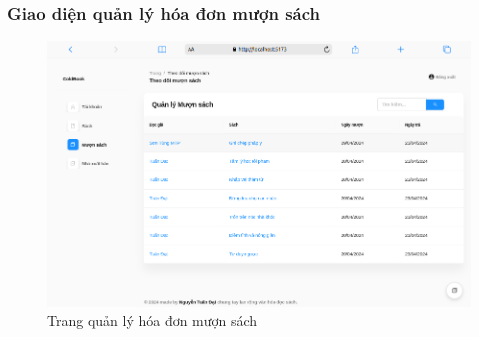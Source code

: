 \subsubsection{Giao diện quản lý hóa đơn mượn sách}
\begin{figure}[H]
  \centering
   \includegraphics[width=1\textwidth]{report/images/admin/muonsach.png}
  \caption{Trang quản lý hóa đơn mượn sách}
\end{figure}
